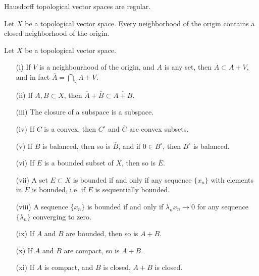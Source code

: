 \begin{corollary}
    Hausdorff topological vector spaces are regular.
\end{corollary}

\begin{corollary}
    Let $X$ be a topological vector space. Every neighborhood of the origin contains a closed neighborhood of the origin.
\end{corollary}

\begin{theorem}
    Let $X$ be a topological vector space.
    \begin{enumerate}
        \item[(i)] If $V$ is a neighbourhood of the origin, and $A$ is any set, then $\overline{A} \subset A + V$, and in fact $\overline{A} = \bigcap_V A + V$.
        \item[(ii)] If $A,B \subset X$, then $\overline{A} + \overline{B} \subset \overline{A + B}$.
        \item[(iii)] The closure of a subspace is a subspace.
        \item[(iv)] If $C$ is a convex, then $C^\circ$ and $\overline{C}$ are convex subsets.
        \item[(v)] If $B$ is balanced, then so is $\overline{B}$, and if $0 \in B^\circ$, then $B^\circ$ is balanced.
        \item[(vi)] If $E$ is a bounded subset of $X$, then so is $\overline{E}$.
        \item[(vii)] A set $E \subset X$ is bounded if and only if any sequence $\{ x_n \}$ with elements in $E$ is bounded, i.e. if $E$ is sequentially bounded.
        \item[(viii)] A sequence $\{ x_n \}$ is bounded if and only if $\lambda_n x_n \to 0$ for any sequence $\{ \lambda_n \}$ converging to zero.
        \item[(ix)] If $A$ and $B$ are bounded, then so is $A + B$.
        \item[(x)] If $A$ and $B$ are compact, so is $A + B$.
        \item[(xi)] If $A$ is compact, and $B$ is closed, $A + B$ is closed.
    \end{enumerate}
\end{theorem}
